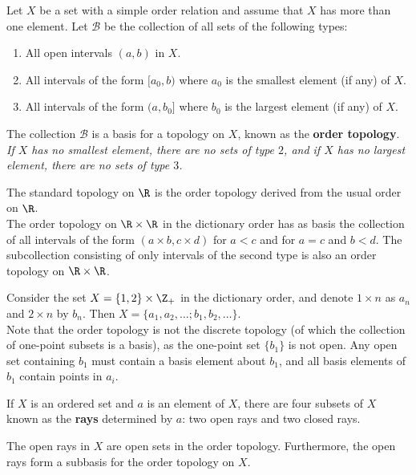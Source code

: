 \begin{definition}
Let $X$ be a set with a simple order relation and assume that $X$ has more than one element. Let $\mathscr{B}$ be the collection
of all sets of the following types:
\begin{enumerate}
    \item All open intervals $(a, b)$ in $X$.
    \item All intervals of the form $[a_0, b)$ where $a_0$ is the smallest element (if any) of $X$.
    \item All intervals of the form $(a, b_0]$ where $b_0$ is the largest element (if any) of $X$.
\end{enumerate}

The collection $\mathscr{B}$ is a basis for a topology on $X$, known as the \textbf{order topology}. \\

\textit{If $X$ has no smallest element, there are no sets of type $2$, and if $X$ has no largest element, there are no sets of type $3$.}
\end{definition}

\begin{eg}
The standard topology on $\R$ is the order topology derived from the usual order on $\R$. \\

The order topology on $\R \times \R$ in the dictionary order has as basis the collection of all intervals of the form $(a \times b, c \times d)$
for $a < c$ and for $a = c$ and $b < d$. The subcollection consisting of only intervals of the second type is also an order topology on $\R \times \R$.
\end{eg}

\begin{eg}
Consider the set $X = \{ 1, 2 \} \times \Z_+$ in the dictionary order, and denote $1 \times n$ as $a_n$ and $2 \times n$ by $b_n$. Then $X = \{ a_1, a_2, \dots ; b_1, b_2, \dots \}$. \\

Note that the order topology is not the discrete topology (of which the collection of one-point subsets is a basis), as the one-point set
$\{ b_1 \}$ is not open. Any open set containing $b_1$ must contain a basis element about $b_1$, and all basis elements of $b_1$ contain points in $a_i$.
\end{eg}

\begin{definition}[Rays of $X$]
If $X$ is an ordered set and $a$ is an element of $X$, there are four subsets of $X$ known as the \textbf{rays} determined by $a$: two open rays and two closed rays.
\end{definition}
\begin{remark}
The open rays in $X$ are open sets in the order topology. Furthermore, the open rays form a subbasis for the order topology on $X$.
\end{remark}

